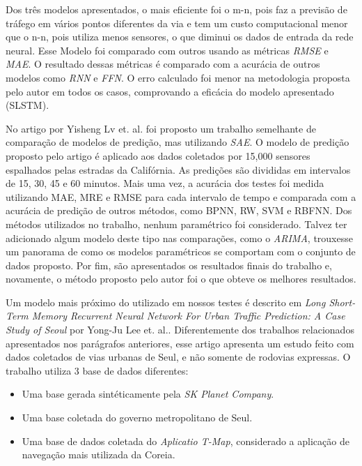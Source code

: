 Dos três modelos apresentados, o mais eficiente foi o m-n, pois faz a previsão de tráfego em vários pontos diferentes da via e tem um custo computacional menor que o n-n, pois utiliza menos sensores, o que diminui os dados de entrada da rede neural. Esse Modelo foi comparado com outros usando as métricas \textit{\acrshort{RMSE}} e \textit{\acrshort{MAE}}. O resultado dessas métricas é comparado com a acurácia de outros modelos como \textit{\acrfull{RNN}} e \textit{\acrfull{FFN}}. O erro calculado foi menor na metodologia proposta pelo autor em todos os casos, comprovando a eficácia do modelo apresentado (SLSTM).

No artigo \cite{lv_6894591} por Yisheng Lv et. al. foi proposto um trabalho semelhante de comparação de modelos de predição, mas utilizando \textit{\acrfull{SAE}}. O modelo de predição proposto pelo artigo é aplicado aos dados coletados por 15,000 sensores espalhados pelas estradas da Califórnia. As predições são divididas em intervalos de 15, 30, 45 e 60 minutos. Mais uma vez, a acurácia dos testes foi medida utilizando  \acrshort{MAE}, \acrshort{MRE} e \acrshort{RMSE} para cada intervalo de tempo e comparada com a acurácia de predição de outros métodos, como \acrfull{BPNN}, \acrfull{RW}, \acrfull{SVM} e \acrfull{RBFNN}. Dos métodos utilizados no trabalho, nenhum paramétrico foi considerado. Talvez ter adicionado algum modelo deste tipo nas comparações, como o \textit{ARIMA}, trouxesse um panorama de como os modelos paramétricos se comportam com o conjunto de dados proposto. Por fim, são apresentados os resultados finais do trabalho e, novamente, o método proposto pelo autor foi o que obteve os melhores resultados. 

Um modelo mais próximo do utilizado em nossos testes é descrito em \textit{Long Short-Term Memory Recurrent Neural Network For Urban Traffic Prediction: A Case Study of Seoul} \cite{Seoul} por Yong-Ju Lee et. al.. Diferentemente dos trabalhos relacionados apresentados nos parágrafos anteriores, esse artigo apresenta um estudo feito com dados coletados de vias urbanas de Seul, e não somente de rodovias expressas. O trabalho utiliza 3 base de dados diferentes:

\begin{itemize}
    \item Uma base gerada sintéticamente pela \textit{SK Planet Company}.
    \item Uma base coletada do governo metropolitano de Seul.
    \item Uma base de dados coletada do \textit{Aplicatio T-Map}, considerado a aplicação de navegação mais utilizada da Coreia.
\end{itemize} 

